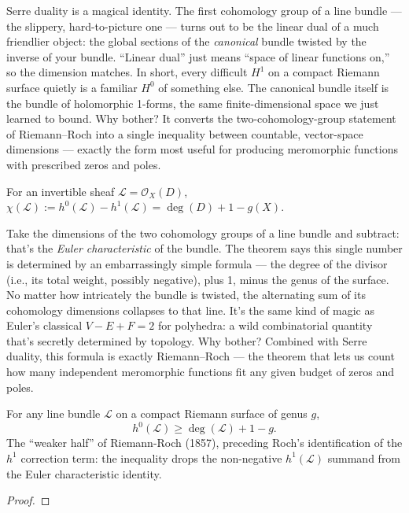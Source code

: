\begin{layman}
Serre duality is a magical identity. The first cohomology group of a
line bundle — the slippery, hard-to-picture one — turns out to be the
linear dual of a much friendlier object: the global sections of the
\emph{canonical} bundle twisted by the inverse of your bundle. ``Linear
dual'' just means ``space of linear functions on,'' so the dimension
matches. In short, every difficult \(H^1\) on a compact Riemann surface
quietly is a familiar \(H^0\) of something else. The canonical bundle
itself is the bundle of holomorphic 1-forms, the same finite-dimensional
space we just learned to bound. Why bother? It converts the
two-cohomology-group statement of Riemann–Roch into a single inequality
between countable, vector-space dimensions — exactly the form most useful
for producing meromorphic functions with prescribed zeros and poles.
\end{layman}

\begin{theorem}
\label{thm:euler-char-line-bundle}
For an invertible sheaf \(\mathcal{L}=\mathcal{O}_X(D)\),
\(\chi(\mathcal{L}) := h^{0}(\mathcal{L}) - h^{1}(\mathcal{L})
                     = \deg(D) + 1 - g(X).\)
\notready
\end{theorem}

\begin{layman}
Take the dimensions of the two cohomology groups of a line bundle and
subtract: that's the \emph{Euler characteristic} of the bundle. The
theorem says this single number is determined by an embarrassingly simple
formula — the degree of the divisor (i.e., its total weight, possibly
negative), plus 1, minus the genus of the surface. No matter how
intricately the bundle is twisted, the alternating sum of its cohomology
dimensions collapses to that line. It's the same kind of magic as
Euler's classical \(V - E + F = 2\) for polyhedra: a wild combinatorial
quantity that's secretly determined by topology. Why bother? Combined
with Serre duality, this formula is exactly Riemann–Roch — the theorem
that lets us count how many independent meromorphic functions fit any
given budget of zeros and poles.
\end{layman}

\begin{theorem}
\label{thm:riemann-inequality}
For any line bundle \(\mathcal{L}\) on a compact Riemann surface of
genus \(g\),
\[
  h^{0}(\mathcal{L}) \ge \deg(\mathcal{L}) + 1 - g .
\]
The ``weaker half'' of Riemann-Roch (1857), preceding Roch's identification
of the \(h^{1}\) correction term: the inequality drops the non-negative
\(h^{1}(\mathcal{L})\) summand from the Euler characteristic identity.
\leanok
\end{theorem}
\begin{proof}\leanok\end{proof}

